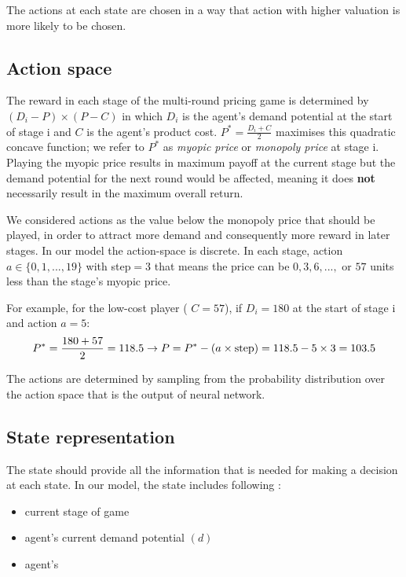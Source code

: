\documentclass[a4paper,12pt]{article}  %
\theoremstyle{definition}
\begin{document}
	The actions at each state are chosen in a way that action with higher valuation is more likely to be chosen. 
	
	\subsection{Action space} 
	
	The reward in each stage of the multi-round pricing game is determined by $ (D_i-P)\times(P-C) $ in which $ D_i $ is the agent's demand potential at the start of stage i and $ C $ is the agent's product cost. $ P^* = \frac{D_i + C}{2} $ maximises this quadratic concave function; we refer to $ P^* $ as \textit{myopic price} or \textit{monopoly price} at stage i. Playing the myopic price results in maximum payoff at the current stage but the demand potential for the next round would be affected, meaning it does\textbf{ not} necessarily result in the maximum overall return.
	
	We considered actions as the value below the monopoly price that should be played, in order to attract more demand and consequently more reward in later stages. In our model the action-space is discrete. In each stage, action $ a \in \lbrace0, 1, ..., 19\rbrace $ with step$ =3 $ that means the price can be $ 0, 3, 6, ... ,$ or $57 $ units less than the stage's myopic price. 
	
	For example, for the low-cost player ( $ C=57 $), if $ D_i = 180 $ at the start of stage i and action $ a = 5 $:
	\begin{equation*}
		P^* = \frac{180 + 57}{2} = 118.5  \rightarrow P = P^*- ( a\times \text{step}) = 118.5 - 5\times 3 = 103.5 \\
	\end{equation*}

	The actions are determined by sampling from the probability distribution over the action space that is the output of neural network.
	
	\subsection{State representation}
	
	The state should provide all the information that is needed for making a decision at each state. 
	In our model, the state includes following :
	\begin{itemize}
		\item current stage of game 
		\item agent's current demand potential $ (d) $
		\item agent's 
	\end{itemize}	
	
\end{document}

